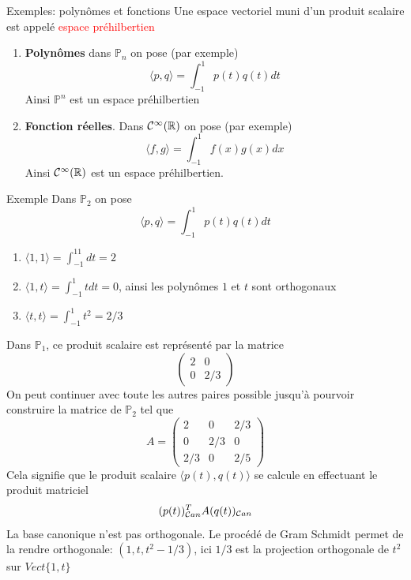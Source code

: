         \begin{parag}{Exemples: polynômes et fonctions}
            Une espace vectoriel muni d'un produit scalaire est appelé \textcolor{red}{espace préhilbertien}
            \begin{enumerate}
                \item \textbf{Polynômes} dans $\mathbb{P}_n$ on pose (par exemple)
                \[\langle p, q \rangle = \int_{-1}^1 p(t)q(t) dt\]
                Ainsi $\mathbb{P}^n$ est un espace préhilbertien
                \item \textbf{Fonction réelles}. Dans $\mathcal{C}^\infty(\mathbb{R})$ on pose (par exemple)
                \[\langle f, g \rangle = \int_{-1}^1f(x)g(x)dx\]
                Ainsi $\mathcal{C}^\infty (\mathbb{R})$ est un espace préhilbertien.
            \end{enumerate}
            \begin{subparag}{Exemple}
                Dans $\mathbb{P}_2$ on pose
                \[\langle p, q\rangle = \int_{-1}^1 p(t)q(t)dt\]
                \begin{enumerate}
                    \item $\langle1, 1\rangle = \int_{-1}^11dt = 2$
                    \item $\langle1, t\rangle = \int_{-1}^1 tdt = 0$, ainsi les polynômes $1$ et $t$ sont orthogonaux
                    \item $\langle t, t\rangle = \int_{-1}^1t^2 = 2/3$
                \end{enumerate}
                Dans $\mathbb{P}_1$, ce produit scalaire est représenté par la matrice
                \[\begin{pmatrix}
                    2 & 0 \\ 0 & 2/3
                \end{pmatrix}\]
                On peut continuer avec toute les autres paires possible jusqu'à pourvoir construire la matrice de $\mathbb{P}_2$ tel que
                \[A = \begin{pmatrix}
                    2 & 0 & 2/3\\
                    0 & 2/3 & 0\\
                    2/3 & 0 & 2/5
                \end{pmatrix}\]
                Cela signifie que le produit scalaire $\langle p(t), q(t) \rangle$ se calcule en effectuant le produit matriciel
                \[(p(t))_{\mathcal{C} an}^T A(q(t))_{\mathcal{C} an}\]
                La base canonique n'est pas orthogonale. Le procédé de Gram Schmidt permet de la rendre orthogonale: $(1, t, t^2 - 1/3)$, ici $1/3$ est la projection orthogonale de $t^2$ sur $Vect\{1, t\}$

\end{subparag}
\end{parag}
